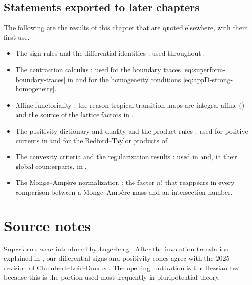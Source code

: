 \subsection*{Statements exported to later chapters}

The following are the results of this chapter that are quoted elsewhere, with
their first use.
\begin{itemize}
\item The sign rules
   and the differential
  identities : used throughout
  .
\item The contraction calculus
  :
  used for the boundary traces \eqref{eq:superform-boundary-traces} in
   and for the homogeneity conditions
  \eqref{eq:appD-strong-homogeneity}.
\item Affine functoriality
  : the reason
  tropical transition maps are integral affine
  () and the source of the lattice factors in
  .
\item The positivity dictionary and duality
   and the
  product rules : used for positive
  currents in  and for the Bedford--Taylor products
  of .
\item The convexity criteria
   and the
  regularization results
  :
  used in  and, in their global counterparts,
  in .
\item The Monge--Amp\`ere normalization
  : the factor $n!$ that reappears in every
  comparison between a Monge--Amp\`ere mass and an intersection number.
\end{itemize}

\section{Source notes}
\label{sec:ch09-source-notes}

Superforms were introduced by Lagerberg \cite{Lag12Super}.  After the
involution translation explained in , our
differential signs and positivity cones agree with the 2025 revision of
Chambert--Loir--Ducros \cite[\S\S1--2]{CLD25}.  The opening motivation is
the Hessian test because this is the portion used most frequently in
pluripotential theory.


